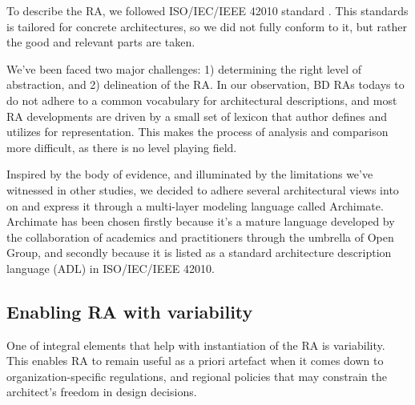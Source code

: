 \documentclass[runningheads]{llncs}
\begin{document}
To describe the RA, we followed ISO/IEC/IEEE 42010 standard \cite{ISO42010}. This standards is tailored for concrete architectures, so we did not fully conform to it, but rather the good and relevant parts are taken. 




We've been faced two major challenges: 1) determining the right level of abstraction, and 2) delineation of the RA. In our observation, BD RAs todays to do not adhere to a common vocabulary for architectural descriptions, and most RA developments are driven by a small set of lexicon that author defines and utilizes for representation. This makes the process of analysis and comparison more difficult, as there is no level playing field. 

Inspired by the body of evidence, and illuminated by the limitations we've witnessed in other studies, we decided to adhere several architectural views into on and express it through a multi-layer modeling language called Archimate. Archimate has been chosen firstly because it's a mature language developed by the collaboration of academics and practitioners through the umbrella of Open Group, and secondly because it is listed as a standard architecture description language (ADL) in ISO/IEC/IEEE 42010. 

\subsection{Enabling RA with variability}

One of integral elements that help with instantiation of the RA is variability. This enables RA to remain useful as a priori artefact when it comes down to organization-specific regulations, and regional policies that may constrain the architect's freedom in design decisions. 
\end{document}
